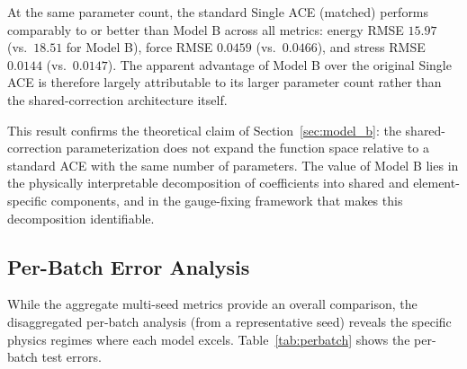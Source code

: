 \documentclass[twoside,prb,aps,floatfix,superscriptaddress,longbibliography]{revtex4-2}
\begin{document}
At the same parameter count, the standard Single ACE (matched) performs comparably to or better than Model B across all metrics: energy RMSE $15.97$ (vs.\ $18.51$ for Model B), force RMSE $0.0459$ (vs.\ $0.0466$), and stress RMSE $0.0144$ (vs.\ $0.0147$). The apparent advantage of Model B over the original Single ACE is therefore largely attributable to its larger parameter count rather than the shared-correction architecture itself.

This result confirms the theoretical claim of Section~\ref{sec:model_b}: the shared-correction parameterization does not expand the function space relative to a standard ACE with the same number of parameters. The value of Model B lies in the physically interpretable decomposition of coefficients into shared and element-specific components, and in the gauge-fixing framework that makes this decomposition identifiable.

\subsection{Per-Batch Error Analysis}
\label{sec:perbatch}

While the aggregate multi-seed metrics provide an overall comparison, the disaggregated per-batch analysis (from a representative seed) reveals the specific physics regimes where each model excels. Table~\ref{tab:perbatch} shows the per-batch test errors.
\end{document}
